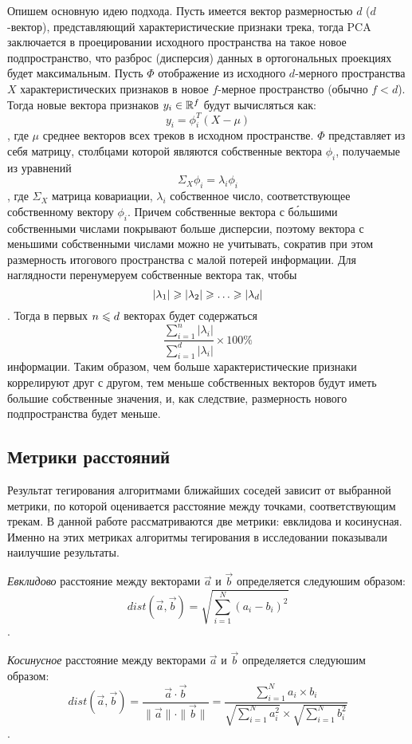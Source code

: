 Опишем основную идею подхода. Пусть имеется вектор размерностью $d$ ($d$-вектор), представляющий характеристические признаки трека, тогда PCA заключается в проецировании исходного пространства
на такое новое подпространство, что разброс (дисперсия) данных в ортогональных проекциях будет максимальным. Пусть $\Phi$ \ld отображение из исходного $d$-мерного пространства $X$ характеристических
признаков в новое $f$-мерное пространство (обычно $f < d$). Тогда новые вектора признаков $y_i \in \mathbb{R}^f$ будут вычисляться как:
$$ y_i = \phi_i^T(X - \mu) $$,
где $\mu$ \ld среднее векторов всех треков в исходном пространстве. $\Phi$ представляет из себя матрицу, столбцами которой являются собственные вектора $\phi_i$, получаемые из уравнений
$$\Sigma_X \phi_i = \lambda_i\phi_i $$,
где $\Sigma_X$ \ld матрица ковариации, $\lambda_i$ \ld собственное число, соответствующее собственному вектору $\phi_i$. Причем собственные вектора с б\'{о}льшими собственными числами покрывают
больше дисперсии, поэтому вектора с меньшими собственными числами можно не учитывать, сократив при этом размерность итогового пространства с малой потерей информации. Для наглядности 
перенумеруем собственные вектора так, чтобы
$$|\lambda_1| \geqslant |\lambda_2| \geqslant \ldots \geqslant |\lambda_d|$$.
Тогда в первых $n \leqslant d$ векторах будет содержаться 
$$\frac{\sum_{i=1}^{n} |\lambda_i|}{\sum_{i=1}^{d} |\lambda_i|} \times 100\%$$ 
информации. Таким образом, чем больше характеристические признаки коррелируют друг с другом, тем меньше собственных векторов будут иметь большие собственные значения, и, как следствие, размерность нового подпространства
будет меньше.

\subsection{Метрики расстояний}

Результат тегирования алгоритмами ближайших соседей зависит от выбранной метрики, по которой оценивается расстояние между точками, соответствующим трекам.
В данной работе рассматриваются две метрики: евклидова и косинусная. Именно на этих метриках алгоритмы тегирования в исследовании \cite{msordo_thesis} показывали наилучшие результаты.

\emph{Евклидово} расстояние между векторами $\vec{a}$ и $\vec{b}$ определяется следуюшим образом:
$$ dist(\vec{a}, \vec{b}) = \sqrt{\sum_{i=1}^{N} (a_i - b_i)^2} $$.

\emph{Косинусное} расстояние между векторами $\vec{a}$ и $\vec{b}$ определяется следуюшим образом:
$$ dist(\vec{a}, \vec{b}) = \frac{\vec{a} \cdot \vec{b}}{\| \vec{a} \| \cdot \| \vec{b} \|} = \frac{\sum_{i=1}^{N} a_i \times b_i}{\sqrt{\sum_{i=1}^{N} a_i^2} \times \sqrt{\sum_{i=1}^{N} b_i^2}} $$.


